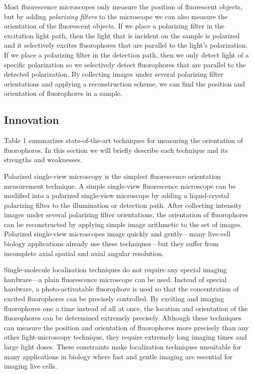 \documentclass[11pt, draft]{article}
\begin{document}
Most fluorescence microscopes only measure the position of fluorescent objects,
but by adding \textit{polarizing filters} to the microscope we can also measure
the orientation of the fluorescent objects. If we place a polarizing filter in
the excitation light path, then the light that is incident on the sample is
polarized and it selectively excites fluorophores that are parallel to the
light's polarization. If we place a polarizing filter in the detection path,
then we only detect light of a specific polarization so we selectively detect
fluorophores that are parallel to the detected polarization. By collecting
images under several polarizing filter orientations and applying a
reconstruction scheme, we can find the position and orientation of fluorophores
in a sample.

\subsection*{Innovation}
Table 1 summarizes state-of-the-art techniques for measuring the orientation of
fluorophores. In this section we will briefly describe each technique and its
strengths and weaknesses. 

Polarized single-view microscopy \cite{demay2011} is the simplest fluorescence
orientation measurement technique. A simple single-view fluorescence microscope
can be modified into a polarized single-view microscope by adding a
liquid-crystal polarizing filter to the illumination or detection path. After
collecting intensity images under several polarizing filter orientations, the
orientation of fluorophores can be reconstructed by applying simple image
arithmetic to the set of images. Polarized single-view microscopes image quickly
and gently---many live-cell biology applications already use these
techniques---but they suffer from incomplete axial spatial and axial angular
resolution.

Single-molecule localization techniques do not require any special imaging
hardware---a plain fluorescence microscope can be used. Instead of special
hardware, a photo-activatable fluorophore is used so that the concentration of
excited fluorophores can be precisely controlled. By exciting and imaging
fluorophores one a time instead of all at once, the location and orientation of
the fluorophores can be determined extremely precisely. Although these techniques
can measure the position and orientation of fluorophores more precisely than any
other light-microscopy technique, they require extremely long imaging times and
large light doses. These constraints make localization techniques unsuitable for
many applications in biology where fast and gentle imaging are essential for
imaging live cells.
\end{document}
